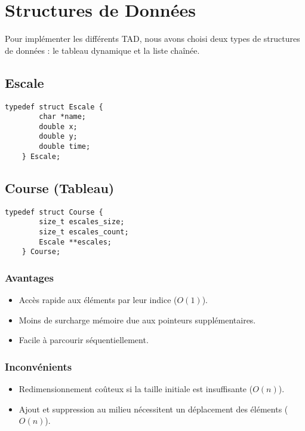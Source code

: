 \section{Structures de Données}\label{structures}

Pour implémenter les différents TAD, nous avons choisi deux types de structures de données : le tableau dynamique et la liste chaînée.

\subsection{Escale}
\begin{lstlisting}[caption={Structure de Escale}]
    typedef struct Escale {
        char *name;
        double x;
        double y;
        double time;
    } Escale;
\end{lstlisting}

\subsection{Course (Tableau)}
\begin{lstlisting}[caption={Structure de Course (tableau)}]
    typedef struct Course {
        size_t escales_size;
        size_t escales_count;
        Escale **escales;
    } Course;
\end{lstlisting}

\subsubsection{Avantages}
\begin{itemize}
    \item Accès rapide aux éléments par leur indice ($O(1)$).
    \item Moins de surcharge mémoire due aux pointeurs supplémentaires.
    \item Facile à parcourir séquentiellement.
\end{itemize}

\subsubsection{Inconvénients}
\begin{itemize}
    \item Redimensionnement coûteux si la taille initiale est insuffisante ($O(n)$).
    \item Ajout et suppression au milieu nécessitent un déplacement des éléments ($O(n)$).
\end{itemize}

